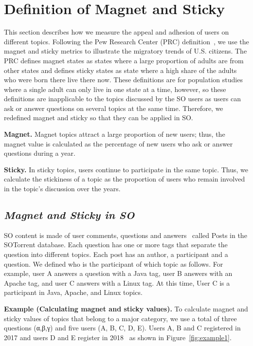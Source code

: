 \documentclass[conference]{IEEEtran}
\begin{document}
\section{Definition of Magnet and Sticky} \label{magnet}
This section describes how we measure the appeal and adhesion of users on different topics. Following the Pew Research Center (PRC) definition~\cite{communityeconomic}, we use the magnet and sticky metrics to illustrate the migratory trends of U.S. citizens. The PRC defines magnet states as states where a large proportion of adults are from other states and defines sticky states as state where a high share of the adults who were born there live there now. These definitions are for population studies where a single adult can only live in one state at a time, however, so these definitions are inapplicable to the topics discussed by the SO users as users can ask or answer questions on several topics at the same time. Therefore, we redefined magnet and sticky so that they can be applied in SO. 

\noindent
\textbf{Magnet.} Magnet topics attract a large proportion of new users; thus, the magnet value is calculated as the percentage of new users who ask or answer questions during a year.

\noindent
\textbf{Sticky.} In sticky topics, users continue to participate in the same topic. Thus, we calculate the stickiness of a topic as the proportion of users who remain involved in the topic’s discussion over the years.


\subsection*{\textit{\textbf{Magnet and Sticky in SO}}}

SO content is made of user comments, questions and answers~\cite{liu2018mining} called Posts in the  SOTorrent\cite{baltes2018sotorrent} database. Each question has one or more tags that separate the question into different topics. Each post has an author, a participant and a question. We defined who is the participant of which topic as follows. For example, user A answers a question with a Java tag, user B answers with an Apache tag, and user C answers with a Linux tag. At this time, User C is a participant in Java, Apache, and Linux topics.


\noindent
\textbf{Example (Calculating magnet and sticky values).}
To calculate magnet and sticky values of topics that belong to a major category, we use a total of three questions (α,β,γ) and five users (A, B, C, D, E). Users A, B and C registered in 2017 and users D and E register in 2018~\cite{yamashita2016magnet} as shown in Figure~\ref{fig:example1}.
\end{document}
